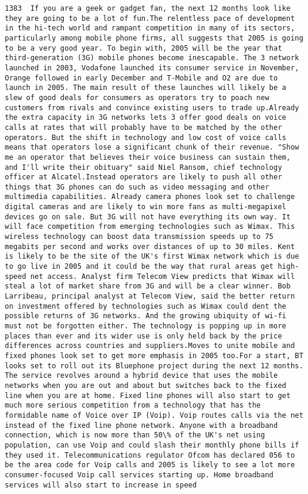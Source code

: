 \documentclass[11pt]{article}
\begin{document}
\begin{Verbatim}[commandchars=\\\{\}]
         1383  If you are a geek or gadget fan, the next 12 months look like they are going to be a lot of fun.The relentless pace of development in the hi-tech world and rampant competition in many of its sectors, particularly among mobile phone firms, all suggests that 2005 is going to be a very good year. To begin with, 2005 will be the year that third-generation (3G) mobile phones become inescapable. The 3 network launched in 2003, Vodafone launched its consumer service in November, Orange followed in early December and T-Mobile and O2 are due to launch in 2005. The main result of these launches will likely be a slew of good deals for consumers as operators try to poach new customers from rivals and convince existing users to trade up.Already the extra capacity in 3G networks lets 3 offer good deals on voice calls at rates that will probably have to be matched by the other operators. But the shift in technology and low cost of voice calls means that operators lose a significant chunk of their revenue. "Show me an operator that believes their voice business can sustain them, and I'll write their obituary" said Niel Ransom, chief technology officer at Alcatel.Instead operators are likely to push all other things that 3G phones can do such as video messaging and other multimedia capabilities. Already camera phones look set to challenge digital cameras and are likely to win more fans as multi-megapixel devices go on sale. But 3G will not have everything its own way. It will face competition from emerging technologies such as Wimax. This wireless technology can boost data transmission speeds up to 75 megabits per second and works over distances of up to 30 miles. Kent is likely to be the site of the UK's first Wimax network which is due to go live in 2005 and it could be the way that rural areas get high-speed net access. Analyst firm Telecom View predicts that Wimax will steal a lot of market share from 3G and will be a clear winner. Bob Larribeau, principal analyst at Telecom View, said the better return on investment offered by technologies such as Wimax could dent the possible returns of 3G networks. And the growing ubiquity of wi-fi must not be forgotten either. The technology is popping up in more places than ever and its wider use is only held back by the price differences across countries and suppliers.Moves to unite mobile and fixed phones look set to get more emphasis in 2005 too.For a start, BT looks set to roll out its Bluephone project during the next 12 months. The service revolves around a hybrid device that uses the mobile networks when you are out and about but switches back to the fixed line when you are at home. Fixed line phones will also start to get much more serious competition from a technology that has the formidable name of Voice over IP (Voip). Voip routes calls via the net instead of the fixed line phone network. Anyone with a broadband connection, which is now more than 50\% of the UK's net using population, can use Voip and could slash their monthly phone bills if they used it. Telecommunications regulator Ofcom has declared 056 to be the area code for Voip calls and 2005 is likely to see a lot more consumer-focused Voip call services starting up. Home broadband services will also start to increase in speed 
\end{Verbatim}
\end{document}
